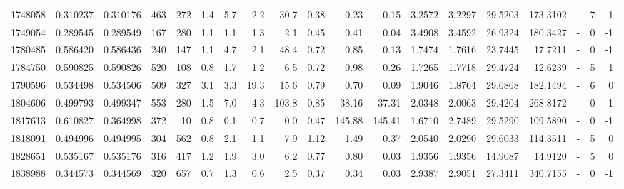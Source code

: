 \begin{tabular}{rrrrrrrrrrrrrrrrlrr}
   1748058 & 0.310237 &   0.310176 &  463 &  272 &      1.4 &      5.7 &     2.2 &     30.7 &       0.38 &        0.23 &        0.15 &  3.2572 &  3.2297 &   29.5203 &  173.3102 &             - &        7 &          1 \\
   1749054 & 0.289545 &   0.289549 &  167 &  280 &      1.1 &      1.1 &     1.3 &      2.1 &       0.45 &        0.41 &        0.04 &  3.4908 &  3.4592 &   26.9324 &  180.3427 &             - &        0 &         -1 \\
   1780485 & 0.586420 &   0.586436 &  240 &  147 &      1.1 &      4.7 &     2.1 &     48.4 &       0.72 &        0.85 &        0.13 &  1.7474 &  1.7616 &   23.7445 &   17.7211 &             - &        0 &         -1 \\
   1784750 & 0.590825 &   0.590826 &  520 &  108 &      0.8 &      1.7 &     1.2 &      6.5 &       0.72 &        0.98 &        0.26 &  1.7265 &  1.7718 &   29.4724 &   12.6239 &             - &        5 &          1 \\
   1790596 & 0.534498 &   0.534506 &  509 &  327 &      3.1 &      3.3 &    19.3 &     15.6 &       0.79 &        0.70 &        0.09 &  1.9046 &  1.8764 &   29.6868 &  182.1494 &             - &        6 &          0 \\
   1804606 & 0.499793 &   0.499347 &  553 &  280 &      1.5 &      7.0 &     4.3 &    103.8 &       0.85 &       38.16 &       37.31 &  2.0348 &  2.0063 &   29.4204 &  268.8172 &             - &        0 &         -1 \\
   1817613 & 0.610827 &   0.364998 &  372 &   10 &      0.8 &      0.1 &     0.7 &      0.0 &       0.47 &      145.88 &      145.41 &  1.6710 &  2.7489 &   29.5290 &  109.5890 &             - &        0 &         -1 \\
   1818091 & 0.494996 &   0.494995 &  304 &  562 &      0.8 &      2.1 &     1.1 &      7.9 &       1.12 &        1.49 &        0.37 &  2.0540 &  2.0290 &   29.6033 &  114.3511 &             - &        5 &          0 \\
   1828651 & 0.535167 &   0.535176 &  316 &  417 &      1.2 &      1.9 &     3.0 &      6.2 &       0.77 &        0.80 &        0.03 &  1.9356 &  1.9356 &   14.9087 &   14.9120 &             - &        5 &          0 \\
   1838988 & 0.344573 &   0.344569 &  320 &  657 &      0.7 &      1.3 &     0.6 &      2.5 &       0.37 &        0.34 &        0.03 &  2.9387 &  2.9051 &   27.3411 &  340.7155 &             - &        0 &         -1 \\

\end{tabular}
